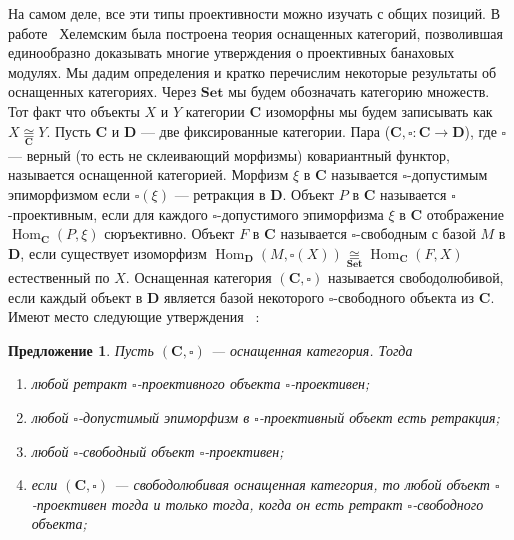 \documentclass[12pt]{article}
\numberwithin{equation}{subsection}
\theoremstyle{plain}
\newtheorem{proposition}{Предложение}
\newcommand{\isom}[1]{\mathop{\mathbin{\cong}}\limits_{#1}}
\begin{document}
\begin{fulltext}
На самом деле, все эти типы проективности можно изучать с общих позиций. В
работе~\cite{HelMetrFrQMod} Хелемским была построена теория оснащенных
категорий, позволившая единообразно доказывать многие утверждения о проективных
банаховых модулях. Мы дадим определения и кратко перечислим некоторые результаты
об оснащенных категориях. Через $\mathbf{Set}$ мы будем обозначать категорию
множеств. Тот факт что объекты $X$ и $Y$ категории $\mathbf{C}$ изоморфны мы
будем записывать как $X\isom{\mathbf{C}}Y$. Пусть $\mathbf{C}$ и $\mathbf{D}$
--- две фиксированные категории. Пара ($\mathbf{C},
\square:\mathbf{C}\to\mathbf{D}$), где $\square$ --- верный (то есть не
склеивающий морфизмы) ковариантный функтор, называется оснащенной категорией.
Морфизм $\xi$ в $\mathbf{C}$ называется $\square$-допустимым эпиморфизмом если
$\square (\xi)$ --- ретракция в $\mathbf{D}$. Объект $P$ в $\mathbf{C}$
называется $\square$-проективным, если для каждого $\square$-допустимого
эпиморфизма $\xi$ в $\mathbf{C}$ отображение
$\operatorname{Hom}_{\mathbf{C}}(P,\xi)$ сюръективно. Объект $F$ в $\mathbf{C}$
называется $\square$-свободным с базой $M$ в  $\mathbf{D}$, если существует
изоморфизм
$\operatorname{Hom}_{\mathbf{D}}(M,\square(X))
\isom{\mathbf{Set}}\operatorname{Hom}_{\mathbf{C}}(F,X)$
естественный по $X$. Оснащенная категория $(\mathbf{C},\square)$ называется
свободолюбивой, если каждый объект в $\mathbf{D}$ является базой некоторого
$\square$-свободного объекта из $\mathbf{C}$. Имеют место следующие утверждения
~\cite{HelMetrFrQMod}:

\begin{proposition}\label{RiggCatResults} Пусть $(\mathbf{C},\square)$ ---
оснащенная категория. Тогда
\begin{enumerate}[label = (\roman*)]
    \item любой ретракт $\square$-проективного объекта $\square$-проективен;

    \item любой $\square$-допустимый эпиморфизм в $\square$-проективный объект
    есть ретракция;

    \item любой $\square$-свободный объект $\square$-проективен;

    \item если $(\mathbf{C},\square)$ --- свободолюбивая оснащенная категория,
    то любой объект $\square$-\newline проективен тогда и только тогда, когда он
    есть ретракт $\square$-свободного объекта;
\end{enumerate}
\end{proposition}


\end{fulltext}
\end{document}
